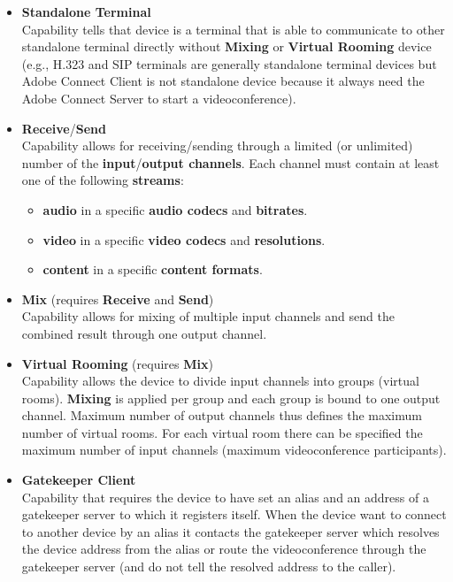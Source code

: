 \documentclass[a4paper]{report}
\begin{document}
\begin{itemize}
\newcommand{\RequireCapability}[1]{(requires #1)}

\item \textbf{Standalone Terminal} \\
  Capability tells that device is a terminal that is able to communicate to
  other standalone terminal directly without \textbf{Mixing} or \textbf{Virtual 
  Rooming} device (e.g., H.323 and SIP terminals are generally standalone 
  terminal devices but Adobe Connect Client is not standalone device because it 
  always need the Adobe Connect Server to start a videoconference).
  
\item \textbf{Receive}/\textbf{Send} \\
  Capability allows for receiving/sending through a limited (or unlimited) 
  number of the \textbf{input}/\textbf{output channels}. Each channel must 
  contain at least one of the following \textbf{streams}:
  \begin{itemize}
    \item \textbf{audio} in a specific \textbf{audio codecs} and 
      \textbf{bitrates}.
    \item \textbf{video} in a specific \textbf{video codecs} and 
      \textbf{resolutions}.
    \item \textbf{content} in a specific \textbf{content formats}.
  \end{itemize} 
  
\item \textbf{Mix} \RequireCapability{\textbf{Receive} and \textbf{Send}} \\
  Capability allows for mixing of multiple input channels and send 
  the combined result through one output channel.

\item \textbf{Virtual Rooming} \RequireCapability{\textbf{Mix}} \\
  Capability allows the device to divide input channels into groups (virtual 
  rooms). \textbf{Mixing} is applied per group and each group 
  is bound to one output channel. Maximum number of output channels thus 
  defines the maximum number of virtual rooms. For each virtual room there can 
  be specified the maximum number of input channels (maximum videoconference 
  participants).

\item \textbf{Gatekeeper Client} \\
  Capability that requires the device to have set an alias 
  and an address of a gatekeeper server to which it registers itself.
  When the device want to connect to another device by an alias it contacts 
  the gatekeeper server which resolves the device address from the alias 
  or route the videoconference through the gatekeeper server (and do not tell
  the resolved address to the caller).
  

\end{itemize}
\end{document}
